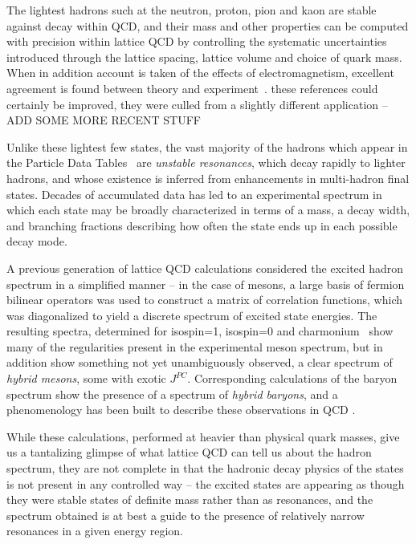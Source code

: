 The lightest hadrons such at the neutron, proton, pion and kaon are stable against decay within QCD, and their mass and other properties can be computed with precision within lattice QCD by controlling the systematic uncertainties introduced through the lattice spacing, lattice volume and choice of quark mass. When in addition account is taken of the effects of electromagnetism, excellent agreement is found between theory and experiment~\cite{Duncan:1996xy, Blum:2007cy, Borsanyi:2014jba, Horsley:2015eaa, Blum:2010ym, Aoki:2012st, deDivitiis:2013xla}. {\color{red} these references could certainly be improved, they were culled from a slightly different application -- ADD SOME MORE RECENT STUFF}

Unlike these lightest few states, the vast majority of the hadrons which appear in the Particle Data Tables~\cite{Patrignani:2016xqp} are \emph{unstable resonances}, which decay rapidly to lighter hadrons, and whose existence is inferred from enhancements in multi-hadron final states. Decades of accumulated data has led to an experimental spectrum in which each state may be broadly characterized in terms of a mass, a decay width, and branching fractions describing how often the state ends up in each possible decay mode. 

A previous generation of lattice QCD calculations considered the excited hadron spectrum in a simplified manner -- in the case of mesons, a large basis of fermion bilinear operators was used to construct a matrix of correlation functions, which was diagonalized to yield a discrete spectrum of excited state energies. The resulting spectra, determined for isospin=1, isospin=0 and charmonium~\cite{Dudek:2010wm,Dudek:2013yja, Liu:2012ze} show many of the regularities present in the experimental meson spectrum, but in addition show something not yet unambiguously observed, a clear spectrum of \emph{hybrid mesons}, some with exotic $J^{PC}$. Corresponding calculations of the baryon spectrum \cite{Dudek:2012ag} show the presence of a spectrum of \emph{hybrid baryons}, and a phenomenology has been built to describe these observations in QCD \cite{Dudek:2011bn}. 

While these calculations, performed at heavier than physical quark masses, give us a tantalizing glimpse of what lattice QCD can tell us about the hadron spectrum, they are not complete in that the hadronic decay physics of the states is not present in any controlled way -- the excited states are appearing as though they were stable states of definite mass rather than as resonances, and the spectrum obtained is at best a guide to the presence of relatively narrow resonances in a given energy region.

